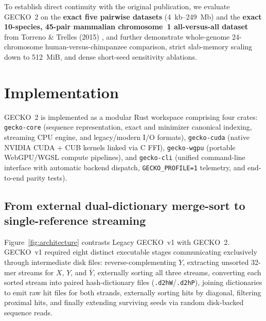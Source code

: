 \documentclass[pdflatex,sn-vancouver,Numbered]{sn-jnl}
\begin{document}
To establish direct continuity with the original publication, we evaluate GECKO~2 on the \textbf{exact five pairwise datasets} (4~kb--249~Mb) and the \textbf{exact 10-species, 45-pair mammalian chromosome~1 all-versus-all dataset} from Torreno \& Trelles (2015) \cite{torreno2015gecko}, and further demonstrate whole-genome 24-chromosome human-versus-chimpanzee comparison, strict slab-memory scaling down to 512~MiB, and dense short-seed sensitivity ablations.

\section{Implementation}\label{sec:implementation}

GECKO~2 is implemented as a modular Rust workspace \cite{matsakis2014rust} comprising four crates: \texttt{gecko-core} (sequence representation, exact and minimizer canonical indexing, streaming CPU engine, and legacy/modern I/O formats), \texttt{gecko-cuda} (native NVIDIA CUDA + CUB kernels linked via C FFI), \texttt{gecko-wgpu} (portable WebGPU/WGSL compute pipelines), and \texttt{gecko-cli} (unified command-line interface with automatic backend dispatch, \texttt{GECKO\_PROFILE=1} telemetry, and end-to-end parity tests).

\subsection{From external dual-dictionary merge-sort to single-reference streaming}\label{subsec:arch}

Figure~\ref{fig:architecture} contrasts Legacy GECKO~v1 with GECKO~2. GECKO~v1 required eight distinct executable stages communicating exclusively through intermediate disk files: reverse-complementing $Y$, extracting unsorted 32-mer streams for $X$, $Y$, and $\bar{Y}$, externally sorting all three streams, converting each sorted stream into paired hash-dictionary files (\texttt{.d2hW}/\texttt{.d2hP}), joining dictionaries to emit raw hit files for both strands, externally sorting hits by diagonal, filtering proximal hits, and finally extending surviving seeds via random disk-backed sequence reads.
\end{document}
